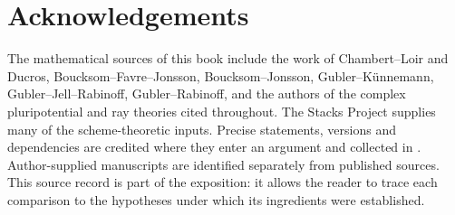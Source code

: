 \chapter*{Acknowledgements}
\label{front:acknowledgements}

The mathematical sources of this book include the work of
Chambert--Loir and Ducros, Boucksom--Favre--Jonsson,
Boucksom--Jonsson, Gubler--K\"unnemann, Gubler--Jell--Rabinoff,
Gubler--Rabinoff, and the authors of the complex pluripotential and
ray theories cited throughout. The Stacks Project supplies many of the
scheme-theoretic inputs. Precise statements, versions and dependencies
are credited where they enter an argument and collected in
. Author-supplied manuscripts are identified separately
from published sources. This source record is part of the exposition:
it allows the reader to trace each comparison to the hypotheses under
which its ingredients were established.
